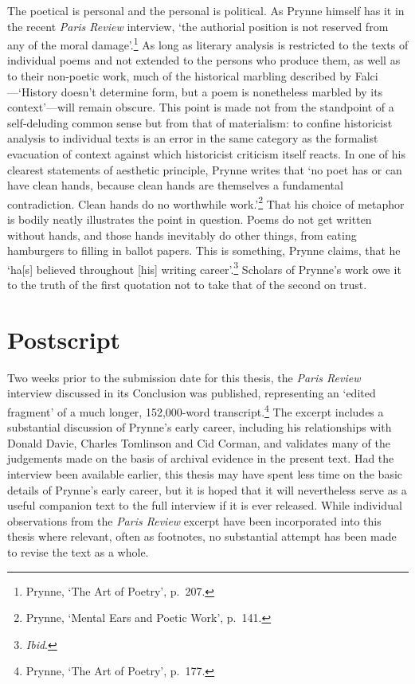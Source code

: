 \documentclass[]{article}
\begin{document}
The poetical is personal and the personal is political. As Prynne
himself has it in the recent \emph{Paris Review} interview, `the
authorial position is not reserved from any of the moral
damage'.\footnote{Prynne, `The Art of Poetry', p.~207.} As long as
literary analysis is restricted to the texts of individual poems and not
extended to the persons who produce them, as well as to their non-poetic
work, much of the historical marbling described by Falci---`History
doesn't determine form, but a poem is nonetheless marbled by its
context'---will remain obscure. This point is made not from the
standpoint of a self-deluding common sense but from that of materialism:
to confine historicist analysis to individual texts is an error in the
same category as the formalist evacuation of context against which
historicist criticism itself reacts. In one of his clearest statements
of aesthetic principle, Prynne writes that `no poet has or can have
clean hands, because clean hands are themselves a fundamental
contradiction. Clean hands do no worthwhile work.'\footnote{Prynne,
  `Mental Ears and Poetic Work', p.~141.} That his choice of metaphor is
bodily neatly illustrates the point in question. Poems do not get
written without hands, and those hands inevitably do other things, from
eating hamburgers to filling in ballot papers. This is something, Prynne
claims, that he `ha{[}s{]} believed throughout {[}his{]} writing
career'.\footnote{\emph{Ibid}.} Scholars of Prynne's work owe it to the
truth of the first quotation not to take that of the second on trust.
\newpage

\section{Postscript}\label{postscript}

Two weeks prior to the submission date for this thesis, the \emph{Paris
Review} interview discussed in its Conclusion was published,
representing an `edited fragment' of a much longer, 152,000-word
transcript.\footnote{Prynne, `The Art of Poetry', p.~177.} The excerpt
includes a substantial discussion of Prynne's early career, including
his relationships with Donald Davie, Charles Tomlinson and Cid Corman,
and validates many of the judgements made on the basis of archival
evidence in the present text. Had the interview been available earlier,
this thesis may have spent less time on the basic details of Prynne's
early career, but it is hoped that it will nevertheless serve as a
useful companion text to the full interview if it is ever released.
While individual observations from the \emph{Paris Review} excerpt have
been incorporated into this thesis where relevant, often as footnotes,
no substantial attempt has been made to revise the text as a whole.
\newpage
\end{document}
